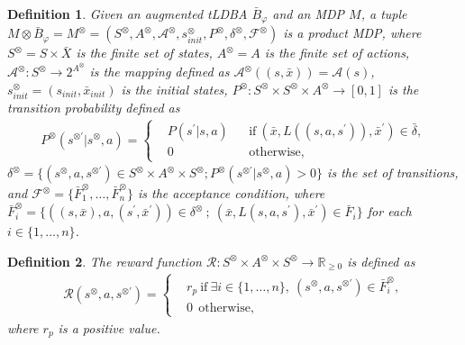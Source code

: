 \documentclass[letterpaper, 10 pt, conference]{ieeeconf}  %
\newtheorem{definition}{Definition}
\begin{document}
\begin{definition}
  Given an augmented tLDBA $\bar{B}_{\varphi}$ and an MDP $M$, a tuple $M \otimes \bar{B}_{\varphi} = M^{\otimes} = (S^{\otimes}, A^{\otimes}, {\mathcal A}^{\otimes}, s_{init}^{\otimes}, P^{\otimes}, \delta^{\otimes}, {\mathcal F}^{\otimes})$ is a product MDP, where
  $S^{\otimes} = S \times \bar{X}$ is the finite set of states, $A^{\otimes}=A$ is the finite set of actions, ${\mathcal A}^{\otimes} : S^{\otimes} \rightarrow 2^{A^{\otimes}}$ is the mapping defined as ${\mathcal A}^{\otimes}((s,\bar{x})) = {\mathcal A}(s)$, $s_{init}^{\otimes} = (s_{init},\bar{x}_{init})$ is the initial states, $P^{\otimes} : S^{\otimes} \times S^{\otimes} \times A^{\otimes} \rightarrow [0,1]$ is the transition probability defined as
  \begin{align}
    P^{\otimes}(s^{\otimes \prime} | s^{\otimes}, a) =
    \left\{
    \begin{aligned}
      &P(s^{\prime} | s, a) &   &\text{if}\  (\bar{x}, L((s,a,s^{\prime})), \bar{x}^{\prime}) \in \bar{\delta},\\
      &0 &   &\text{otherwise} ,
    \end{aligned}
    \right. \nonumber
  \end{align}
  $\delta^{\otimes} = \{ (s^{\otimes}, a, s^{\otimes \prime}) \in S^{\otimes} \times A^{\otimes} \times S^{\otimes} ; P^{\otimes}(s^{\otimes \prime} | s^{\otimes}, a) > 0 \}$ is the set of transitions, and ${\mathcal F}^{\otimes} = \{ \bar{F}^{\otimes}_1, \ldots ,\bar{F}^{\otimes}_n \}$ is the acceptance condition, where $\bar{F}^{\otimes}_i = \{ ((s,\bar{x}), a, (s^{\prime}, \bar{x}^{\prime})) \in \delta^{\otimes}\ ;\ (\bar{x}, L(s,a,s^{\prime}), \bar{x}^{\prime}) \in \bar{F}_i \}$ for each $ i \in \{ 1, \ldots ,n \}$.
\end{definition}

\begin{definition}
  The reward function $\mathcal{R} :S^{\otimes} \times A^{\otimes} \times S^{\otimes} \rightarrow {\mathbb R}_{\geq 0}$ is defined as
  \begin{align}
    \mathcal{R}(s^{\otimes}, a, s^{\otimes \prime}) =
    \left\{
    \begin{aligned}
      &r_p \  \text{if}\ \exists i \in \! \{ 1, \ldots ,n \},\ (s^{\otimes}, a, s^{\otimes \prime}) \in \bar{F}^{\otimes}_i \!,\\
      &0   \ \ \text{otherwise},
    \end{aligned}
    \right. \nonumber
  \end{align}
  where $r_p$ is a positive value.
\end{definition}
\end{document}
